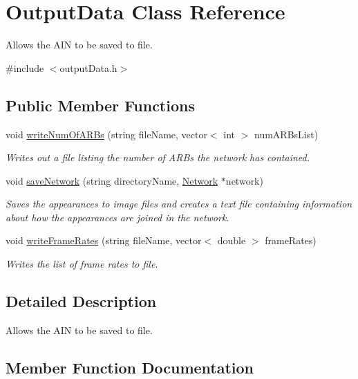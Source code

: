 \hypertarget{class_output_data}{}\section{Output\+Data Class Reference}
\label{class_output_data}


Allows the A\+I\+N to be saved to file.  




{\ttfamily \#include $<$output\+Data.\+h$>$}

\subsection*{Public Member Functions}
\begin{DoxyCompactItemize}
\item 
void \hyperlink{class_output_data_aa233ec3bd0c4b9f381ba8ccb46f21443}{write\+Num\+Of\+A\+R\+Bs} (string file\+Name, vector$<$ int $>$ num\+A\+R\+Bs\+List)
\begin{DoxyCompactList}\small\item\em Writes out a file listing the number of A\+R\+Bs the network has contained. \end{DoxyCompactList}\item 
void \hyperlink{class_output_data_acccb676f62c27d703a7aae83333ab5ca}{save\+Network} (string directory\+Name, \hyperlink{class_network}{Network} $\ast$network)
\begin{DoxyCompactList}\small\item\em Saves the appearances to image files and creates a text file containing information about how the appearances are joined in the network. \end{DoxyCompactList}\item 
void \hyperlink{class_output_data_a6928c41ff82d541ac1eecef838358414}{write\+Frame\+Rates} (string file\+Name, vector$<$ double $>$ frame\+Rates)
\begin{DoxyCompactList}\small\item\em Writes the list of frame rates to file. \end{DoxyCompactList}\end{DoxyCompactItemize}


\subsection{Detailed Description}
Allows the A\+I\+N to be saved to file. 

\subsection{Member Function Documentation}
\hypertarget{class_output_data_acccb676f62c27d703a7aae83333ab5ca}{}
